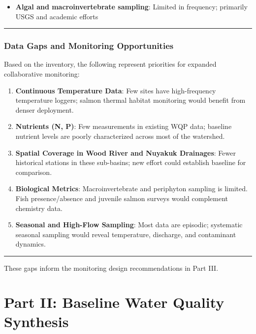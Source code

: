 \documentclass[
  letterpaper,
]{scrbook}
\providecommand{\tightlist}{%
  \setlength{\itemsep}{0pt}\setlength{\parskip}{0pt}}\usepackage{longtable,booktabs,array}
\begin{document}
\begin{itemize}
\tightlist
\item
  \textbf{Algal and macroinvertebrate sampling}: Limited in frequency;
  primarily USGS and academic efforts
\end{itemize}

\begin{center}\rule{0.5\linewidth}{0.5pt}\end{center}

\section{Data Gaps and Monitoring
Opportunities}\label{data-gaps-and-monitoring-opportunities}

Based on the inventory, the following represent priorities for expanded
collaborative monitoring:

\begin{enumerate}
\def\labelenumi{\arabic{enumi}.}
\item
  \textbf{Continuous Temperature Data}: Few sites have high-frequency
  temperature loggers; salmon thermal habitat monitoring would benefit
  from denser deployment.
\item
  \textbf{Nutrients (N, P)}: Few measurements in existing WQP data;
  baseline nutrient levels are poorly characterized across most of the
  watershed.
\item
  \textbf{Spatial Coverage in Wood River and Nuyakuk Drainages}: Fewer
  historical stations in these sub-basins; new effort could establish
  baseline for comparison.
\item
  \textbf{Biological Metrics}: Macroinvertebrate and periphyton sampling
  is limited. Fish presence/absence and juvenile salmon surveys would
  complement chemistry data.
\item
  \textbf{Seasonal and High-Flow Sampling}: Most data are episodic;
  systematic seasonal sampling would reveal temperature, discharge, and
  contaminant dynamics.
\end{enumerate}

\begin{center}\rule{0.5\linewidth}{0.5pt}\end{center}

These gaps inform the monitoring design recommendations in Part III.

\part{Part II: Baseline Water Quality Synthesis}
\end{document}
